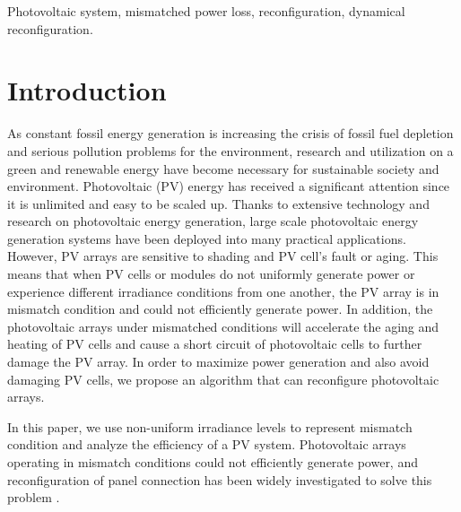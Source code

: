 \documentclass[conference]{IEEEtran}
\begin{document}
\begin{IEEEkeywords}
  Photovoltaic system, mismatched power loss, reconfiguration, dynamical reconfiguration.
\end{IEEEkeywords}

\section{Introduction} \label{intro}
As constant fossil energy generation is increasing the crisis of fossil fuel depletion and serious pollution problems for the environment, 
research and utilization on a green and renewable energy have become necessary for sustainable society and environment.
Photovoltaic (PV) energy has received a significant attention since it is unlimited and easy to be scaled up. Thanks to extensive technology and research on photovoltaic energy generation, large scale photovoltaic energy generation systems have been deployed into many practical applications. However, PV arrays are sensitive to shading and PV cell's fault or aging. This means that when 
PV cells or modules do not uniformly generate power
 or experience different irradiance conditions from one another, the PV array is in mismatch condition and could not efficiently generate power. In addition, the photovoltaic arrays under mismatched conditions will accelerate the aging and heating of PV cells and cause a short circuit of photovoltaic cells to further damage the PV array. In order to maximize power generation and also avoid damaging PV cells, we propose an algorithm that can reconfigure photovoltaic arrays.
 
In this paper, we use non-uniform irradiance levels to represent mismatch condition and analyze the efficiency of a PV system.
Photovoltaic arrays operating in mismatch conditions could not efficiently generate power, and reconfiguration of  panel connection has been widely investigated to solve this problem \cite{b2}.
\end{document}
